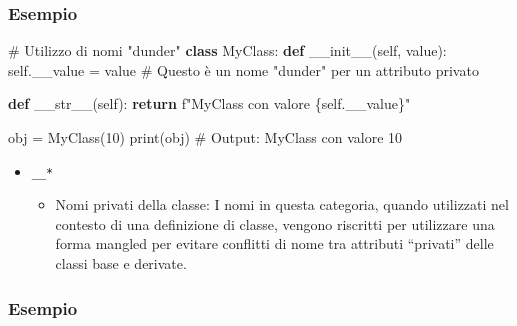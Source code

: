 \documentclass[
  letterpaper,
]{scrbook}
\newenvironment{Shaded}{\begin{snugshade}}{\end{snugshade}}
\newcommand{\BuiltInTok}[1]{\textcolor[rgb]{0.00,0.23,0.31}{#1}}
\newcommand{\CommentTok}[1]{\textcolor[rgb]{0.37,0.37,0.37}{#1}}
\newcommand{\ControlFlowTok}[1]{\textcolor[rgb]{0.00,0.23,0.31}{\textbf{#1}}}
\newcommand{\DecValTok}[1]{\textcolor[rgb]{0.68,0.00,0.00}{#1}}
\newcommand{\FunctionTok}[1]{\textcolor[rgb]{0.28,0.35,0.67}{#1}}
\newcommand{\KeywordTok}[1]{\textcolor[rgb]{0.00,0.23,0.31}{\textbf{#1}}}
\newcommand{\NormalTok}[1]{\textcolor[rgb]{0.00,0.23,0.31}{#1}}
\newcommand{\OperatorTok}[1]{\textcolor[rgb]{0.37,0.37,0.37}{#1}}
\newcommand{\SpecialCharTok}[1]{\textcolor[rgb]{0.37,0.37,0.37}{#1}}
\newcommand{\SpecialStringTok}[1]{\textcolor[rgb]{0.13,0.47,0.30}{#1}}
\newcommand{\VariableTok}[1]{\textcolor[rgb]{0.07,0.07,0.07}{#1}}
\providecommand{\tightlist}{%
  \setlength{\itemsep}{0pt}\setlength{\parskip}{0pt}}\usepackage{longtable,booktabs,array}
\begin{document}
\subsubsection{Esempio}\label{esempio-1}

\begin{Shaded}
\begin{Highlighting}[]
\CommentTok{\# Utilizzo di nomi "dunder"}
\KeywordTok{class}\NormalTok{ MyClass:}
    \KeywordTok{def} \FunctionTok{\_\_init\_\_}\NormalTok{(}\VariableTok{self}\NormalTok{, value):}
        \VariableTok{self}\NormalTok{.\_\_value }\OperatorTok{=}\NormalTok{ value  }\CommentTok{\# Questo è un nome "dunder" per un attributo privato}
    
    \KeywordTok{def} \FunctionTok{\_\_str\_\_}\NormalTok{(}\VariableTok{self}\NormalTok{):}
        \ControlFlowTok{return} \SpecialStringTok{f"MyClass con valore }\SpecialCharTok{\{}\VariableTok{self}\SpecialCharTok{.}\NormalTok{\_\_value}\SpecialCharTok{\}}\SpecialStringTok{"}

\NormalTok{obj }\OperatorTok{=}\NormalTok{ MyClass(}\DecValTok{10}\NormalTok{)}
\BuiltInTok{print}\NormalTok{(obj)  }\CommentTok{\# Output: MyClass con valore 10}
\end{Highlighting}
\end{Shaded}

\begin{itemize}
\tightlist
\item
  \texttt{\_\_*}

  \begin{itemize}
  \tightlist
  \item
    Nomi privati della classe: I nomi in questa categoria, quando
    utilizzati nel contesto di una definizione di classe, vengono
    riscritti per utilizzare una forma mangled per evitare conflitti di
    nome tra attributi ``privati'' delle classi base e derivate.
  \end{itemize}
\end{itemize}

\subsubsection{Esempio}\label{esempio-2}
\end{document}
